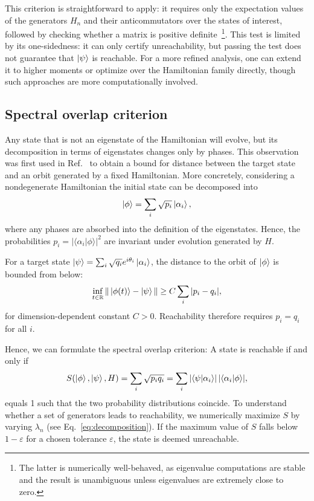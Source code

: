 \documentclass[aps,prx,reprint,superscriptaddress,footnote, twocolumn,notitlepage]{revtex4-2}
\begin{document}
This criterion is straightforward to apply: it requires only the expectation values of the generators $H_n$ and their anticommutators over the states of interest, followed by checking whether a matrix is positive definite~\footnote{The latter is numerically well-behaved, as eigenvalue computations are stable and the result is unambiguous unless eigenvalues are extremely close to zero.}. This test is limited by its one-sidedness: it can only certify unreachability, but passing the test does not guarantee that $\ket{\psi}$ is reachable. For a more refined analysis, one can extend it to higher moments or optimize over the Hamiltonian family directly, though such approaches are more computationally involved.

\subsection{{Spectral overlap criterion}}\label{ssec:spec}
Any state that is not an eigenstate of the Hamiltonian will evolve, but its decomposition in terms of eigenstates changes only by phases. This observation was first used in Ref.~\cite{schirmer_design_2018} to obtain a bound for distance between the target state and an orbit generated by a fixed Hamiltonian. More concretely, considering a nondegenerate Hamiltonian the initial state can be decomposed into
\begin{equation}
    \ket{\phi} = \sum_i \sqrt{p_i} \ket{\alpha_i},
\end{equation}
where any phases are absorbed into the definition of the eigenstates. Hence, the probabilities $p_i = |\langle \alpha_i | \phi \rangle|^2$ are invariant under evolution generated by $H$.

For a target state $\ket{\psi} = \sum_i \sqrt{q_i} e^{i\theta_i} \ket{\alpha_i}$, the distance to the orbit of $\ket{\phi}$ is bounded from below:%
\begin{equation}
    \inf_{t \in \mathbb{R}} \| \ket{\phi(t)} - \ket{\psi} \| \geq C \sum_i |p_i - q_i|,
\end{equation}
for dimension-dependent constant $C > 0$. Reachability therefore requires $p_i = q_i$ for all $i$.

Hence, we can formulate the spectral overlap criterion: A state is reachable if and only if
\begin{equation} \label{eq:specfom}
    S(\ket{\phi}, \ket{\psi}, H) = \sum_i \sqrt{p_i q_i} = \sum_i |\langle \psi | \alpha_i \rangle| \, |\langle \alpha_i | \phi \rangle|,
\end{equation}
equals 1 such that the two probability distributions coincide. To understand whether a set of generators leads to reachability, we numerically maximize $S$ by varying $\lambda_n$ (see Eq.~\eqref{eq:decomposition}). If the maximum value of $S$ falls below $1 - \varepsilon$ for a chosen tolerance $\varepsilon$, the state is deemed unreachable.
\end{document}
